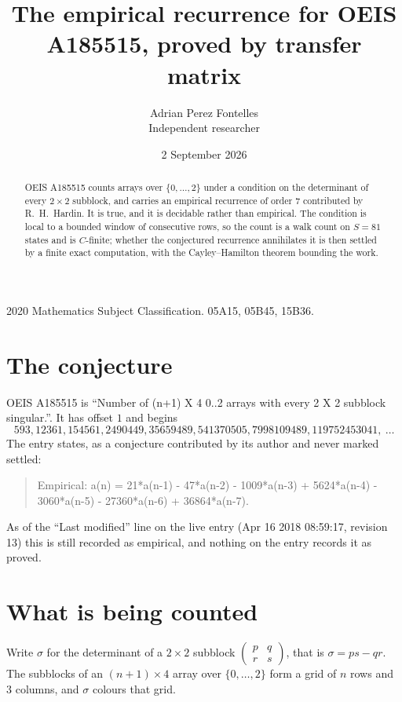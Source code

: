 \documentclass[11pt,a4paper]{article}
\title{The empirical recurrence for OEIS A185515, proved by transfer matrix}
\author{Adrian Perez Fontelles\\ \small Independent researcher}
\date{2 September 2026}
\theoremstyle{plain}
\theoremstyle{definition}
\begin{document}
\maketitle

\begin{abstract}
OEIS A185515 counts arrays over $\{0,\dots,2\}$ under a condition on the determinant of every
$2\times2$ subblock, and carries an empirical recurrence of order $7$ contributed by
R.~H.~Hardin. It is true, and it is decidable rather than empirical. The condition is local to
a bounded window of consecutive rows, so the count is a walk count on $S=81$ states and is
$C$-finite; whether the conjectured recurrence annihilates it is then settled by a finite exact
computation, with the Cayley--Hamilton theorem bounding the work.
\end{abstract}

\noindent\small 2020 Mathematics Subject Classification. 05A15, 05B45, 15B36.\normalsize

\section{The conjecture}

OEIS A185515 is ``Number of (n+1) X 4 0..2 arrays with every 2 X 2 subblock singular.''. It has offset $1$ and begins
\[
593, 12361, 154561, 2490449, 35659489, 541370505, 7998109489, 119752453041,\ \dots
\]
The entry states, as a conjecture contributed by its author and never marked settled:
\begin{quote}
Empirical: a(n) = 21*a(n-1) - 47*a(n-2) - 1009*a(n-3) + 5624*a(n-4) - 3060*a(n-5) - 27360*a(n-6) + 36864*a(n-7).
\end{quote}
As of the ``Last modified'' line on the live entry (Apr 16 2018 08:59:17, revision 13) this is still
recorded as empirical, and nothing on the entry records it as proved.

\section{What is being counted}

Write $\sigma$ for the determinant of a $2\times2$ subblock
$\begin{pmatrix}p&q\\r&s\end{pmatrix}$, that is $\sigma=ps-qr$. The subblocks of an
$(n+1)\times4$ array over $\{0,\dots,2\}$ form a grid of $n$ rows and $3$
columns, and $\sigma$ colours that grid.
\end{document}
